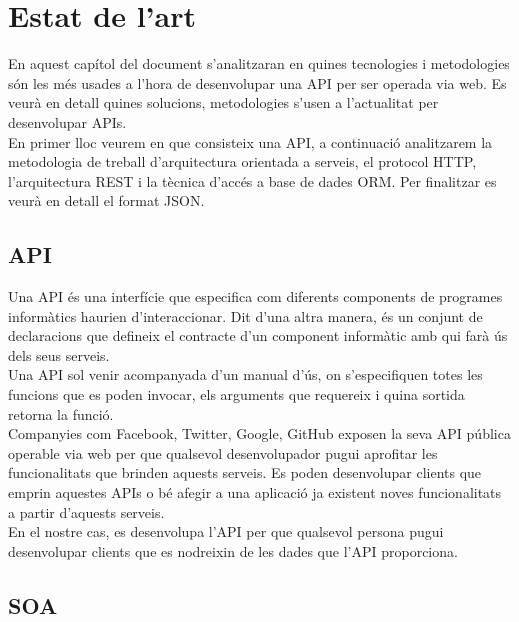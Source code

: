 
\chapter{Estat de l'art}\label{entorn}

En aquest capítol del document s'analitzaran en quines tecnologies i metodologies són les més usades a l'hora de desenvolupar una \ac{API} per ser operada via web. Es veurà en detall quines solucions, metodologies s'usen a l'actualitat per desenvolupar \ac{API}s.\\

En primer lloc veurem en que consisteix una \ac{API}, a continuació analitzarem la metodologia de treball d'arquitectura orientada a serveis, el protocol \ac{HTTP}, l'arquitectura \ac{REST} i la tècnica d'accés a base de dades \ac{ORM}. Per finalitzar es veurà en detall el format \ac{JSON}.

\section{\ac{API}}\label{sec_api}

Una \ac{API} és una interfície que especifica com diferents components de programes informàtics haurien d'interaccionar. Dit d'una altra manera, és un conjunt de declaracions que defineix el contracte d'un component informàtic amb qui farà ús dels seus serveis.\\

Una \ac{API} sol venir acompanyada d'un manual d'ús, on s'especifiquen totes les funcions que es poden invocar, els arguments que requereix i quina sortida retorna la funció.\\

Companyies com Facebook, Twitter, Google, GitHub exposen la seva \ac{API} pública operable via web per que qualsevol desenvolupador pugui aprofitar les funcionalitats que brinden aquests serveis. Es poden desenvolupar clients que emprin aquestes \ac{API}s o bé afegir a una aplicació ja existent noves funcionalitats a partir d'aquests serveis.\\

En el nostre cas, es desenvolupa l'\ac{API} per que qualsevol persona pugui desenvolupar clients que es nodreixin de les dades que l'\ac{API} proporciona.
 
\section{\ac{SOA}} \label{sec_soa}

